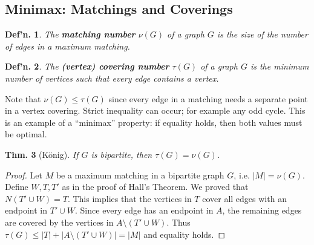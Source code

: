 \documentclass[12pt, a4paper]{book}
\newtheorem{theorem}{Thm.}[section]
\newtheorem{definition}[theorem]{Def'n.}
\theoremstyle{nonumberplain}
\newtheorem{proof}{Proof}
\begin{document}
\subsection{Minimax: Matchings and Coverings}
\begin{definition}
    The \textbf{matching number} $\nu(G)$ of a graph $G$ is the size of the number of edges in a maximum matching.
\end{definition}
\begin{definition}
    The \textbf{(vertex) covering number} $\tau(G)$ of a graph $G$ is the minimum number of vertices such that every edge contains a vertex.
\end{definition}
Note that $\nu(G)\leq\tau(G)$ since every edge in a matching needs a separate point in a vertex covering.
Strict inequality can occur; for example any odd cycle.
This is an example of a ``minimax'' property: if equality holds, then both values must be optimal.
\begin{theorem}[K\"onig]
    If $G$ is bipartite, then $\tau(G)=\nu(G)$.
\end{theorem}
\begin{proof}
    Let $M$ be a maximum matching in a bipartite graph $G$, i.e. $|M|=\nu(G)$.
    Define $W,T,T'$ as in the proof of Hall's Theorem.
    We proved that $N(T'\cup W)=T$.
    This implies that the vertices in $T$ cover all edges with an endpoint in $T'\cup W$.
    Since every edge has an endpoint in $A$, the remaining edges are covered by the vertices in $A\setminus(T'\cup W)$.
    Thus $\tau(G)\leq |T|+|A\setminus(T'\cup W)|=|M|$ and equality holds.
\end{proof}
\end{document}
